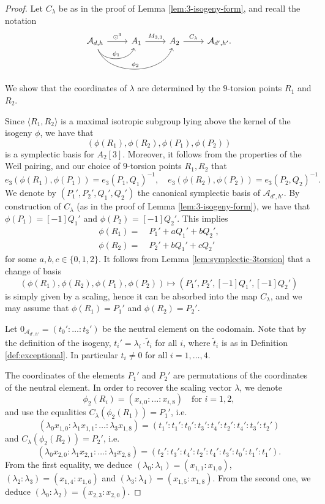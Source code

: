 \documentclass[11pt]{amsart}
\theoremstyle{definition}
\newcommand{\A}{\mathcal{A}}
\newcommand{\cube}{\odot^3}
\begin{document}
\begin{proof} 

Let $C_\lambda$ be as in the proof of Lemma \ref{lem:3-isogeny-form}, and recall the notation 
\[
\begin{tikzcd}
    \A_{d,h} \rar{\cube} \arrow[bend right = 70, "\phi_1"]{r}  \arrow[bend right = 70, "\phi_2"]{rr}  & A_1 \rar{M_{3,3}} & A_2 \rar{C_\lambda} & \A_{d',h'}.
\end{tikzcd}
\]
We show that the coordinates of $\lambda$ are determined by the $9$-torsion points  $R_1$ and $R_2$. 

Since $\langle R_1,R_2\rangle$ is a maximal isotropic subgroup lying above the kernel of the isogeny $\phi$, we have that 
\[
(\phi(R_1),\phi(R_2),\phi(P_1), \phi({P}_2))
\]
is a symplectic basis for $A_2[3]$. Moreover, it follows from the properties of the Weil pairing, and our choice of $9$-torsion points $R_1,R_2$ that
\[
e_3(\phi(R_1), \phi(P_1)) = e_3(P_1,Q_1)^{-1}, \quad  e_3(\phi(R_2), \phi(P_2)) = e_3(P_2,Q_2)^{-1}.
\]
We denote by $(P_1',P_2',Q_1',Q_2')$ the canonical symplectic basis of $\A_{d',h'}$. By construction of $C_\lambda$ (as in the proof of Lemma \ref{lem:3-isogeny-form}), we have that $\phi(P_1) = [-1]Q_1'$ and $\phi(P_2)$ = $[-1]Q_2'$. This implies
\begin{align*}
\phi(R_1) =&~P_1' + a Q_1' + b Q_2', \\
\phi(R_2) =&~P_2' + b Q_1' + c Q_2' 
\end{align*}
for some $a,b,c \in \{0,1,2\}$. It follows from Lemma \ref{lem:symplectic-3torsion} that a change of basis \[(\phi(R_1),\phi(R_2),\phi(P_1), \phi({P}_2)) \mapsto (P_1',P_2',[-1]Q_1',[-1]Q_2')\] is simply given by a scaling, hence it can be absorbed into the map $C_\lambda$, and we may assume that $\phi(R_1) = P_1'$ and $\phi(R_2) = P_2'$. 

Let $0_{\A_{d',h'}} = (t_0': \dots : t_3')$ be the neutral element on the codomain. Note that by the definition of the isogeny,  $t_i' = \lambda_i \cdot \tilde{t}_i$ for all $i$, where $\tilde{t}_i$ is as in Definition \ref{def:exceptional}. In particular $t_i \neq 0$ for all $i = 1, \dots, 4$.

The coordinates of the elements $P_1'$ and $P_2'$ are permutations of the coordinates of the neutral element. In order to recover the scaling vector $\lambda$, we denote
\[
    \phi_2(R_i) = (x_{i,0}:\dots: x_{i,8}) \quad \text{for } i =1,2,
\]
and use the equalities $C_\lambda(\phi_2(R_1)) = P_1'$, i.e.
\[
\left(\lambda_0 x_{1,0}: \lambda_1 x_{1,1} : \dots: \lambda_3 x_{1,8}\right) = 
 (t_1' : t_1' : t_0':  t_3': t_4' : t_2' :  t_4' : t_3' : t_2')
\]
and $C_\lambda(\phi_2(R_2)) = P_2'$, i.e.
\[
\left(\lambda_0 x_{2,0}: \lambda_1 x_{2,1} : \dots: \lambda_3 x_{2,8}\right)  = 
(t_2': t_3' : t_4' : t_2' : t_4' : t_3 ': t_0' : t_1' : t_1' ).
\]
From the first equality, we deduce $(\lambda_0: \lambda_1) = (x_{1,1}:x_{1,0})$, $(\lambda_2:\lambda_3) = (x_{1,4}:x_{1,6})$ and $(\lambda_3:\lambda_4) = (x_{1,5}:x_{1,8})$. From the second one, we deduce $(\lambda_{0}:\lambda_{2}) = (x_{2,3}:x_{2,0})$. 
\end{proof}
\end{document}
